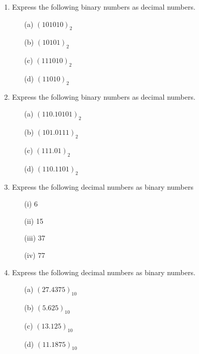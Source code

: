 \documentclass[]{report}
\begin{document}
\begin{enumerate}
\item Express the following binary numbers as decimal numbers.
  \begin{multicols}{4}
    \begin{itemize}
    \item[(a)] $(101010)_{2}$
    \item[(b)] $(10101)_{2}$
    \item[(c)] $(111010)_{2}$
    \item[(d)] $(11010)_{2}$
    \end{itemize}
  \end{multicols}
  \item Express the following binary numbers as decimal numbers.
  \begin{multicols}{4}
    \begin{itemize}
    \item[(a)] $(110.10101)_{2}$
    \item[(b)] $(101.0111)_{2}$
    \item[(c)] $(111.01)_{2}$
    \item[(d)] $(110.1101)_{2}$
    \end{itemize}
  \end{multicols}


	\item Express the following decimal numbers as binary numbers
	\begin{multicols}{2}
		\begin{itemize}
			\item[(i)] 6
			\item[(ii)] 15
			\item[(iii)] 37
			\item[(iv)] 77
		\end{itemize}
	\end{multicols}

\item Express the following decimal numbers as binary numbers.
  \begin{multicols}{4}
    \begin{itemize}
    \item[(a)] $(27.4375)_{10}$  %
    \item[(b)] $(5.625)_{10}$
    \item[(c)] $(13.125)_{10}$
    \item[(d)] $(11.1875)_{10}$
    \end{itemize}
  \end{multicols}


\end{enumerate}
\end{document}
